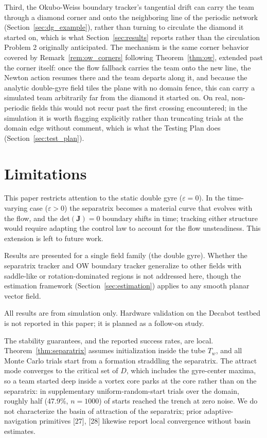 \documentclass[lettersize,journal]{IEEEtran}
\begin{document}
Third, the Okubo-Weiss boundary tracker's tangential drift can carry the
team through a diamond corner and onto the neighboring line of the
periodic network (Section~\ref{sec:dg_example}), rather than turning to
circulate the diamond it started on, which is what
Section~\ref{sec:results} reports rather than the circulation Problem 2
originally anticipated. The mechanism is the same corner behavior
covered by Remark~\ref{rem:ow_corners} following Theorem~\ref{thm:ow},
extended past the corner itself: once the flow fallback carries the team
onto the new line, the Newton action resumes there and the team departs
along it, and because the analytic double-gyre field tiles the plane
with no domain fence, this can carry a simulated team arbitrarily far
from the diamond it started on. On real, non-periodic fields this
would not recur past the first crossing encountered; in the simulation
it is worth flagging explicitly rather than truncating trials at the
domain edge without comment, which is what the Testing Plan does
(Section~\ref{sec:test_plan}).


\section{Limitations}
\label{sec:limitations}

This paper restricts attention to the static double gyre ($\varepsilon = 0$).
In the time-varying case ($\varepsilon > 0$) the separatrix becomes a
material curve that evolves with the flow, and the det$(\mathbf{J}) = 0$
boundary shifts in time; tracking either structure would require adapting
the control law to account for the flow unsteadiness. This extension is
left to future work.

Results are presented for a single field family (the double gyre). Whether
the separatrix tracker and OW boundary tracker generalize to other fields
with saddle-like or rotation-dominated regions is not addressed here,
though the estimation framework (Section~\ref{sec:estimation}) applies
to any smooth planar vector field.

All results are from simulation only. Hardware validation on the Decabot
testbed is not reported in this paper; it is planned as a follow-on study.

The stability guarantees, and the reported success rates, are local.
Theorem~\ref{thm:separatrix} assumes initialization inside the tube
$T_w$, and all Monte Carlo trials start from a formation straddling the
separatrix. The attract mode converges to the critical set of $D$, which
includes the gyre-center maxima, so a team started deep inside a vortex
core parks at the core rather than on the separatrix: in supplementary
uniform-random-start trials over the domain, roughly half (47.9\%,
$n = 1000$) of starts reached the trench at zero noise. We do not
characterize the basin of attraction of the separatrix; prior
adaptive-navigation primitives [27], [28] likewise report local
convergence without basin estimates.
\end{document}
